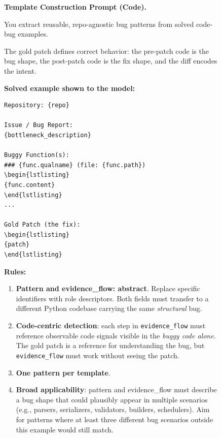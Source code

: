 \documentclass{llmxive}
\begin{document}
\begin{figure}[!t]
\centering
\begin{tcolorbox}[colback=gray!5, colframe=gray!50,
                  boxrule=0.5pt, arc=2mm,
                  left=4pt, right=4pt, top=3pt, bottom=3pt]
\small
\textbf{Template Construction Prompt (Code).}

You extract reusable, repo-agnostic bug patterns from solved code-bug examples.

The gold patch defines correct behavior: the pre-patch code is the bug shape, the post-patch code is the fix shape, and the diff encodes the intent.

\medskip
\textbf{Solved example shown to the model:}
\begin{verbatim}
Repository: {repo}

Issue / Bug Report:
{bottleneck_description}

Buggy Function(s):
### {func.qualname} (file: {func.path})
\begin{lstlisting}
{func.content}
\end{lstlisting}
...

Gold Patch (the fix):
\begin{lstlisting}
{patch}
\end{lstlisting}
\end{verbatim}

\medskip
\textbf{Rules:}
\begin{enumerate}[topsep=0pt, itemsep=0ex, parsep=0pt, left=14pt]
  \item \textbf{Pattern and evidence\_flow: abstract}. Replace specific identifiers with role descriptors. Both fields must transfer to a different Python codebase carrying the same \emph{structural} bug.
  \item \textbf{Code-centric detection}: each step in \texttt{evidence\_flow} must reference observable code signals visible in the \emph{buggy code alone}. The gold patch is a reference for understanding the bug, but \texttt{evidence\_flow} must work without seeing the patch.
  \item \textbf{One pattern per template}.
  \item \textbf{Broad applicability}: pattern and evidence\_flow must describe a bug shape that could plausibly appear in multiple scenarios (e.g., parsers, serializers, validators, builders, schedulers). Aim for patterns where at least three different bug scenarios outside this example would still match.
\end{enumerate}


\end{tcolorbox}
\end{figure}
\end{document}
